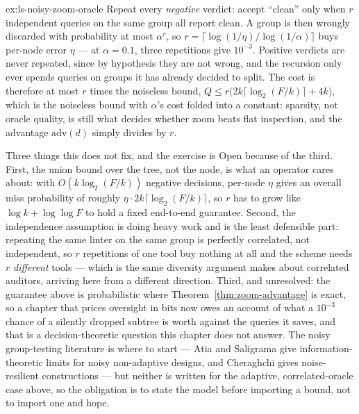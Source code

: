 \documentclass[11pt,a4paper]{article}
\theoremstyle{definition}
\theoremstyle{plain}
\begin{document}
\begin{pdsolution}{ex:ls-noisy-zoom-oracle}
Repeat every \emph{negative} verdict: accept ``clean'' only when $r$ independent
queries on the same group all report clean. A group is then wrongly discarded with
probability at most $\alpha^{r}$, so $r=\lceil\log(1/\eta)/\log(1/\alpha)\rceil$
buys per-node error $\eta$ --- at $\alpha=0.1$, three repetitions give $10^{-3}$.
Positive verdicts are never repeated, since by hypothesis they are not wrong, and
the recursion only ever spends queries on groups it has already decided to split.
The cost is therefore at most $r$ times the noiseless bound,
$Q\le r\bigl(2k\lceil\log_2(F/k)\rceil+4k\bigr)$, which is the noiseless bound with
$\alpha$'s cost folded into a constant: sparsity, not oracle quality, is still what
decides whether zoom beats flat inspection, and the advantage
$\mathrm{adv}(d)$ simply divides by $r$.

Three things this does not fix, and the exercise is Open because of the third.
First, the union bound over the tree, not the node, is what an operator cares
about: with $O(k\log_2(F/k))$ negative decisions, per-node $\eta$ gives an overall
miss probability of roughly $\eta\cdot 2k\lceil\log_2(F/k)\rceil$, so $r$ has to
grow like $\log k+\log\log F$ to hold a fixed end-to-end guarantee. Second, the
independence assumption is doing heavy work and is the least defensible part:
repeating the same linter on the same group is perfectly correlated, not
independent, so $r$ repetitions of one tool buy nothing at all and the scheme
needs $r$ \emph{different} tools --- which is the same diversity argument
 makes about correlated auditors, arriving
here from a different direction. Third, and unresolved: the guarantee above is
probabilistic where Theorem~\ref{thm:zoom-advantage} is exact, so a chapter that
prices oversight in bits now owes an account of what a $10^{-3}$ chance of a
silently dropped subtree is worth against the queries it saves, and that is a
decision-theoretic question this chapter does not answer. The noisy
group-testing literature is where to start --- Atia and Saligrama
 give information-theoretic limits for noisy
non-adaptive designs, and Cheraghchi  gives noise-resilient
constructions --- but neither is written for the adaptive, correlated-oracle case
above, so the obligation is to state the model before importing a bound, not to
import one and hope.
\end{pdsolution}
\end{document}
